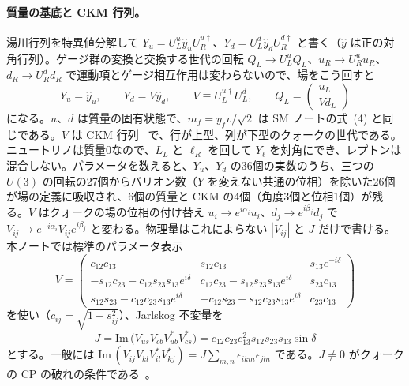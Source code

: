 \documentclass[a4paper,10pt]{ltjsarticle}
\newcommand{\im}{\mathrm{Im}\,}
\begin{document}
\paragraph{質量の基底と CKM 行列。}湯川行列を特異値分解して $Y_u=U^u_L\hat y_uU^{u\dagger}_R$、$Y_d=U^d_L\hat y_dU^{d\dagger}_R$ と書く（$\hat y$ は正の対角行列）。ゲージ群の変換と交換する世代の回転 $Q_L\to U^u_LQ_L$、$u_R\to U^u_Ru_R$、$d_R\to U^d_Rd_R$ で運動項とゲージ相互作用は変わらないので、場をこう回すと
\begin{equation}
Y_u=\hat y_u,\qquad Y_d=V\hat y_d,\qquad V\equiv U^{u\dagger}_LU^d_L,\qquad
Q_L=\begin{pmatrix}u_L\\ Vd_L\end{pmatrix}
\label{eq:QL}
\end{equation}
になる。$u$、$d$ は質量の固有状態で、$m_f=y_fv/\sqrt2$ は SM ノートの式~(4) と同じである。$V$ は CKM 行列~\cite{cabibbo63,km73} で、行が上型、列が下型のクォークの世代である。ニュートリノは質量0なので、$L_L$ と $\ell_R$ を回して $Y_\ell$ を対角にでき、レプトンは混合しない。パラメータを数えると、$Y_u$、$Y_d$ の36個の実数のうち、三つの $U(3)$ の回転の27個からバリオン数（$Y$ を変えない共通の位相）を除いた26個が場の定義に吸収され、6個の質量と CKM の4個（角度3個と位相1個）が残る。$V$ はクォークの場の位相の付け替え $u_i\to e^{i\alpha_i}u_i$、$d_j\to e^{i\beta_j}d_j$ で $V_{ij}\to e^{-i\alpha_i}V_{ij}e^{i\beta_j}$ と変わる。物理量はこれによらない $|V_{ij}|$ と $J$ だけで書ける。本ノートでは標準のパラメータ表示~\cite{ck84,pdg24}
\begin{equation}
V=\begin{pmatrix}
c_{12}c_{13} & s_{12}c_{13} & s_{13}e^{-i\delta}\\
-s_{12}c_{23}-c_{12}s_{23}s_{13}e^{i\delta} & c_{12}c_{23}-s_{12}s_{23}s_{13}e^{i\delta} & s_{23}c_{13}\\
s_{12}s_{23}-c_{12}c_{23}s_{13}e^{i\delta} & -c_{12}s_{23}-s_{12}c_{23}s_{13}e^{i\delta} & c_{23}c_{13}
\end{pmatrix}
\label{eq:Vstd}
\end{equation}
を使い（$c_{ij}=\sqrt{1-s_{ij}^2}$）、Jarlskog 不変量を
\begin{equation}
J=\im\bigl(V_{us}V_{cb}V_{ub}^*V_{cs}^*\bigr)=c_{12}c_{23}c_{13}^2s_{12}s_{23}s_{13}\sin\delta
\label{eq:J}
\end{equation}
とする。一般には $\im(V_{ij}V_{kl}V_{il}^*V_{kj}^*)=J\sum_{m,n}\epsilon_{ikm}\epsilon_{jln}$ である。$J\ne0$ がクォークの CP の破れの条件である~\cite{jarlskog85}。
\end{document}
